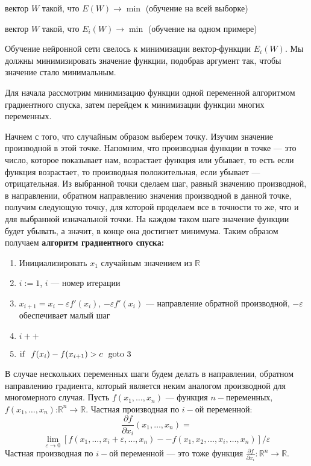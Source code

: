 \documentclass[14pt]{extreport}
\begin{document}
вектор $W$ такой, что $E(W) \rightarrow \min$ (обучение на всей выборке)

вектор $W$ такой, что $E_i(W) \rightarrow \min$ (обучение на одном примере)

Обучение нейронной сети свелось к минимизации вектор-функции $E_i(W)$. Мы должны минимизировать значение функции, подобрав аргумент так, чтобы значение стало минимальным.

Для начала рассмотрим минимизацию функции одной переменной алгоритмом градиентного спуска, затем перейдем к минимизации функции многих переменных.

Начнем с того, что случайным образом выберем точку. Изучим значение производной в этой точке. Напомним, что производная функции в точке --- это число, которое показывает нам, возрастает функция или убывает, то есть если функция возрастает, то производная положительная, если убывает --- отрицательная.
Из выбранной точки сделаем шаг, равный значению производной, в направлении, обратном направлению значения производной в данной точке, получим следующую точку, для которой проделаем все в точности то же, что и для выбранной изначальной точки. На каждом таком шаге значение функции будет убывать, а значит, в конце она достигнет минимума. Таким образом получаем \textbf{алгоритм градиентного спуска:}
\begin{enumerate}
 \item Инициализировать $x_1$ случайным значением из $\mathbb{R}$
 \item $i:=1$, $i$ --- номер итерации
 \item $x_{i+1}=x_i-\varepsilon f'(x_i)$, $-\varepsilon f'(x_i)$ --- направление обратной производной, $-\varepsilon$ обеспечивает малый шаг
 \item $i++$
 \item ${\rm if}\ \ f(x_{i})-f(x_{i+1}) >c\ \ {\rm goto}\ 3$
\end{enumerate}

В случае нескольких переменных шаги будем делать в направлении, обратном направлению градиента, который является неким аналогом производной для многомерного случая.
Пусть $f(x_1, \ldots, x_n)$ --- функция $n-$переменных, $f(x_1, \ldots, x_n)$:$\mathbb{R}^n\rightarrow \mathbb{R}$.
Частная производная по $i-$ой переменной: $$\frac{\partial f}{\partial x_i}(x_1, \ldots, x_n) = $$
$$\lim_{\varepsilon \to  0}[f(x_1, \ldots, x_i + \varepsilon, \ldots, x_n) -- f(x_1, x_2, \ldots, x_i, \ldots, x_n)]/ \varepsilon$$
Частная производная по $i-$ой переменной --- это тоже функция $\frac{\partial f}{\partial x_i}: \mathbb{R}^n\rightarrow \mathbb{R}$.
\end{document}
